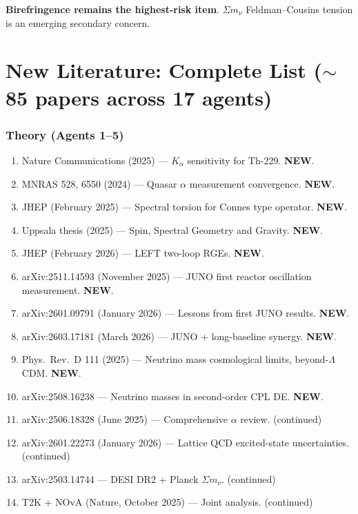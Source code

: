 \documentclass[11pt,a4paper]{article}
\newcommand{\NEW}{\textcolor{dfdblue}{\textbf{NEW}}}
\begin{document}
\textbf{Birefringence remains the highest-risk item}. $\Sigma m_\nu$ Feldman--Cousins tension is an emerging secondary concern.


\part{New Literature: Complete List ($\sim$85 papers across 17 agents)}

\section{Theory (Agents 1--5)}

\begin{enumerate}
\item Nature Communications (2025) --- $K_\alpha$ sensitivity for Th-229. \NEW.
\item MNRAS 528, 6550 (2024) --- Quasar $\alpha$ measurement convergence. \NEW.
\item JHEP (February 2025) --- Spectral torsion for Connes type operator. \NEW.
\item Uppsala thesis (2025) --- Spin, Spectral Geometry and Gravity. \NEW.
\item JHEP (February 2026) --- LEFT two-loop RGEs. \NEW.
\item arXiv:2511.14593 (November 2025) --- JUNO first reactor oscillation measurement. \NEW.
\item arXiv:2601.09791 (January 2026) --- Lessons from first JUNO results. \NEW.
\item arXiv:2603.17181 (March 2026) --- JUNO + long-baseline synergy. \NEW.
\item Phys.\ Rev.\ D 111 (2025) --- Neutrino mass cosmological limits, beyond-$\Lambda$CDM. \NEW.
\item arXiv:2508.16238 --- Neutrino masses in second-order CPL DE. \NEW.
\item arXiv:2506.18328 (June 2025) --- Comprehensive $\alpha$ review. (continued)
\item arXiv:2601.22273 (January 2026) --- Lattice QCD excited-state uncertainties. (continued)
\item arXiv:2503.14744 --- DESI DR2 + Planck $\Sigma m_\nu$. (continued)
\item T2K + NOvA (Nature, October 2025) --- Joint analysis. (continued)
\end{enumerate}
\end{document}
